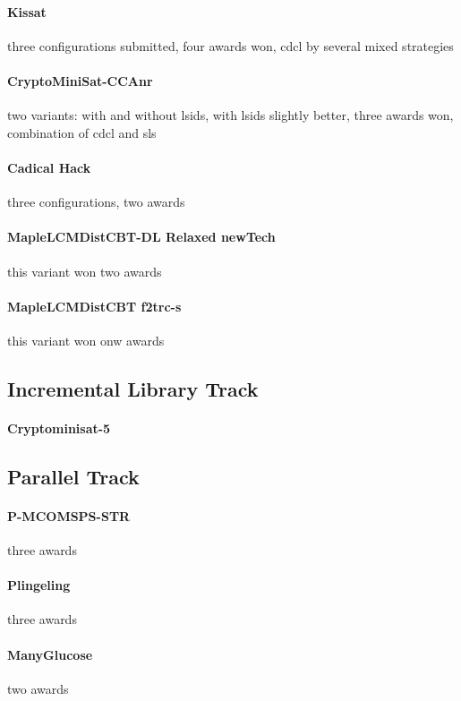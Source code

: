 \documentclass{elsarticle}
\begin{document}
\paragraph{Kissat} 
three configurations submitted, four awards won, cdcl by several mixed strategies

\paragraph{CryptoMiniSat-CCAnr}
two variants: with and without lsids, with lsids slightly better, three awards won,  combination of cdcl and sls

\paragraph{Cadical Hack}
three configurations, two awards

\paragraph{MapleLCMDistCBT-DL Relaxed newTech}
this variant won two awards

\paragraph{MapleLCMDistCBT f2trc-s}
this variant won onw awards


\subsection{Incremental Library Track}
\paragraph{Cryptominisat-5}


\subsection{Parallel Track}

\paragraph{P-MCOMSPS-STR} three awards

\paragraph{Plingeling} three awards

\paragraph{ManyGlucose} two awards
\end{document}
